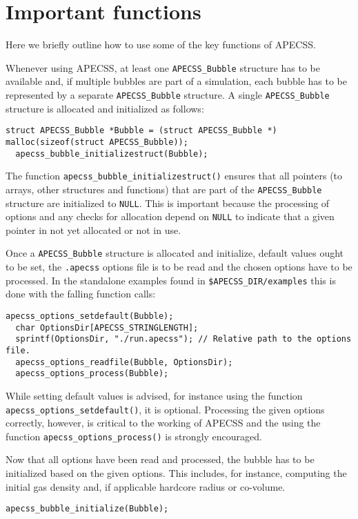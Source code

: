 \section{Important functions}

Here we briefly outline how to use some of the key functions of APECSS. 

Whenever using APECSS, at least one {\tt APECSS\_Bubble} structure has to be available and, if multiple bubbles are part of a simulation, each bubble has to be represented by a separate {\tt APECSS\_Bubble} structure. A single {\tt APECSS\_Bubble} structure is allocated and initialized as follows:
\begin{lstlisting}[style=CStyle]
  struct APECSS_Bubble *Bubble = (struct APECSS_Bubble *) malloc(sizeof(struct APECSS_Bubble));
  apecss_bubble_initializestruct(Bubble);
\end{lstlisting}\vspace{-0.75em}
The function {\tt apecss\_bubble\_initializestruct()} ensures that all pointers (to arrays, other structures and functions) that are part of the {\tt APECSS\_Bubble} structure are initialized to {\tt NULL}. This is important because the processing of options and any checks for allocation depend on {\tt NULL} to indicate that a given pointer in not yet allocated or not in use.

Once a {\tt APECSS\_Bubble} structure is allocated and initialize, default values ought to be set, the {\tt *.apecss} options file is to be read and the chosen options have to be processed. In the standalone examples found in {\tt \$APECSS\_DIR/examples} this is done with the falling function calls:
\begin{lstlisting}[style=CStyle]
  apecss_options_setdefault(Bubble);
  char OptionsDir[APECSS_STRINGLENGTH];
  sprintf(OptionsDir, "./run.apecss"); // Relative path to the options file.
  apecss_options_readfile(Bubble, OptionsDir);
  apecss_options_process(Bubble);
\end{lstlisting}\vspace{-0.75em}
While setting default values is advised, for instance using the function {\tt apecss\_options\_setdefault()}, it is optional. Processing the given options correctly, however, is critical to the working of APECSS and the using the function {\tt apecss\_options\_process()} is strongly encouraged.

Now that all options have been read and processed, the bubble has to be initialized based on the given options. This includes, for instance, computing the initial gas density and, if applicable hardcore radius or co-volume.
\begin{lstlisting}[style=CStyle]
  apecss_bubble_initialize(Bubble);
\end{lstlisting}%


